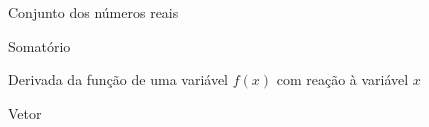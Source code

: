 \begin{simbolos}
  \item[$ \mathbb{R} $] Conjunto dos números reais
  \item[$ \sum $] Somatório
  \item[$ \dfrac{df}{dx} $] Derivada da função de uma variável $f(x)$ com reação à variável $x$
  \item[$ \overrightarrow{v} $] Vetor
\end{simbolos}


\tableofcontents*
\cleardoublepage